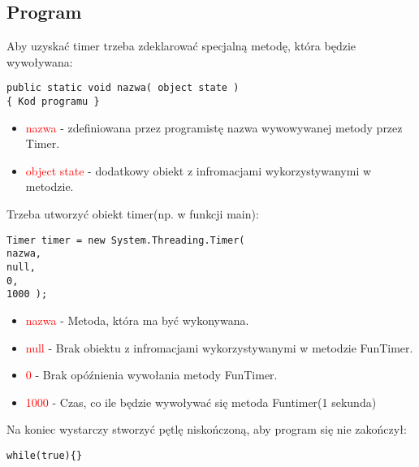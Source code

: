 \documentclass{article}
\begin{document}
\subsection{Program}
Aby uzyskać timer trzeba zdeklarować specjalną metodę, która będzie wywoływana:
\begin{lstlisting}[frame=single]
public static void nazwa( object state )
{ Kod programu }
\end{lstlisting}
\begin{itemize}
\item \textcolor{red}{nazwa} - zdefiniowana przez programistę nazwa wywowywanej metody przez Timer.
\item \textcolor{red}{object state} - dodatkowy obiekt z infromacjami wykorzystywanymi w metodzie.
\end{itemize}
Trzeba utworzyć obiekt timer(np. w funkcji main):
\begin{lstlisting}[frame=single]
Timer timer = new System.Threading.Timer(
nazwa,
null,
0,
1000 );
 \end{lstlisting}
\begin{itemize}
\item \textcolor{red}{nazwa} - Metoda, która ma być wykonywana.
\item \textcolor{red}{null} - Brak obiektu z infromacjami wykorzystywanymi w metodzie FunTimer.
\item \textcolor{red}{0} - Brak opóźnienia wywołania metody FunTimer.
\item \textcolor{red}{1000} - Czas, co ile będzie wywoływać się metoda Funtimer(1 sekunda)
\end{itemize}
Na koniec wystarczy stworzyć pętlę niskończoną, aby program się nie zakończył:
\begin{lstlisting}[frame=single]
while(true){}
\end{lstlisting}
\end{document}

